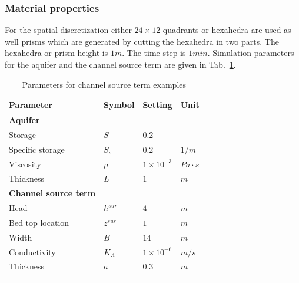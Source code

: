 \subsubsection*{Material properties}
%
For the spatial discretization either $24\times 12$ quadrants or hexahedra are used as well prisms which are generated by cutting the hexahedra in two parts. The hexahedra or prism height is $1m$. The time step is $1 min$.
Simulation parameters for the aquifer and the channel source term are given in Tab.~\ref{GW_ChannelPercolation}.
%
\begin{table}[H]
 \centering
 \caption{Parameters for channel source term examples}
 \centering \label{GW_ChannelPercolation}
 \begin{tabular}{llll}
 \hline\hline\noalign{\smallskip}
  {\bf Parameter} & {\bf Symbol} & {\bf Setting} & {\bf Unit} \\ \hline
 {\bf Aquifer} & & & \\
 Storage & $S$ & $0.2$ & $-$ \\
 Specific storage & $S_s$ & $0.2$ & $1/m$ \\
 Viscosity  & $\mu$ & $1\times 10^{-3}$ & $Pa\cdot s$\\
 Thickness & $L$ & $1$ & $m$ \\ \hline
 {\bf Channel source term} & & & \\
 Head & $h^{sur}$ & $4$ & $m$ \\
 Bed top location& $z^{sur}$ & $1$ & $m$ \\
 Width & $B$ & $14$ & $m$ \\
 Conductivity & $K_{\Lambda}$ & $1\times 10^{-6}$ & $m/s$ \\
 Thickness & $a$ & $0.3$ & $m$ \\
 \noalign{\smallskip}\hline\hline
 \end{tabular}
\end{table}
%
